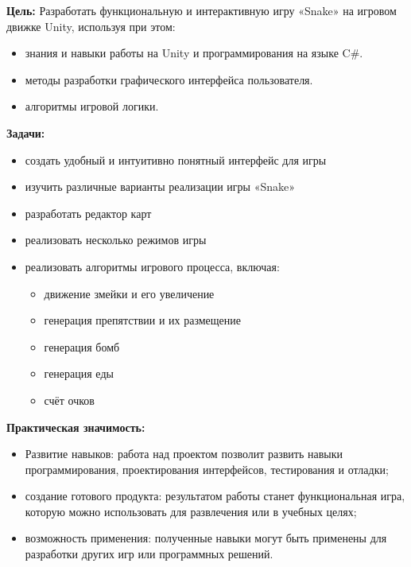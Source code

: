 \documentclass[14pt, oneside]{altsu-report}
\begin{document}
\textbf{Цель:} Разработать функциональную и интерактивную игру «Snake» на
игровом движке Unity, используя при этом:
\begin{itemize}
\item{знания и навыки работы на Unity и программирования на языке C\#.}
\item{методы разработки графического интерфейса пользователя.}
\item{алгоритмы игровой логики.}
\end{itemize}
\textbf{Задачи:}
\begin{itemize}
    \item создать удобный и интуитивно понятный интерфейс для игры
    \item изучить различные варианты реализации игры «Snake»
    \item разработать редактор карт
    \item реализовать несколько режимов игры
    \item реализовать алгоритмы игрового процесса, включая:
    \begin{itemize}
        \item движение змейки и его увеличение
        \item генерация препятствии и их размещение
        \item генерация бомб
        \item генерация еды
        \item счёт очков
    \end{itemize}
\end{itemize}

\textbf{Практическая значимость:}

\begin{itemize}
    \item Развитие навыков: работа над проектом позволит развить навыки программирования, проектирования интерфейсов, тестирования и отладки;
    \item создание готового продукта: результатом работы станет функциональная игра, которую можно использовать для развлечения или в учебных целях;
    \item  возможность применения: полученные навыки могут быть применены для разработки других игр или программных решений.
\end{itemize}






\end{document}

